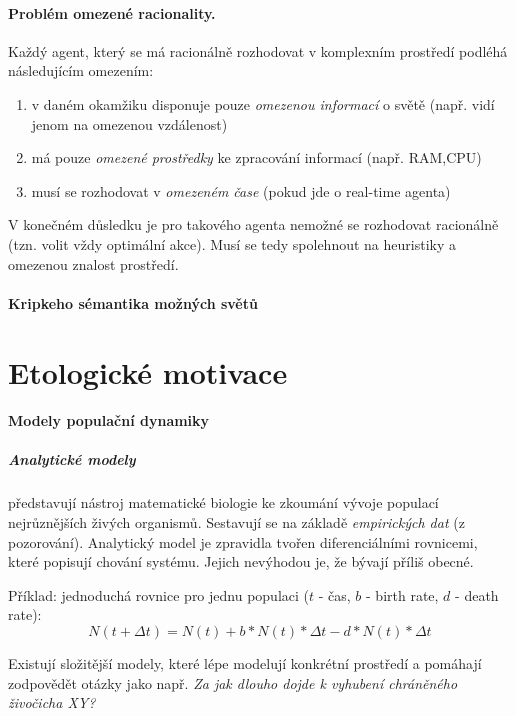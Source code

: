 \documentclass[a4paper]{article}      %
\begin{document}
\paragraph{Problém omezené racionality.} Každý agent, který se má racionálně rozhodovat v komplexním prostředí podléhá následujícím omezením:
\begin{enumerate}
\item v daném okamžiku disponuje pouze \emph{omezenou informací} o světě (např. vidí jenom na omezenou vzdálenost)
\item má pouze \emph{omezené prostředky} ke zpracování informací (např. RAM,CPU)
\item musí se rozhodovat v \emph{omezeném čase} (pokud jde o real-time agenta)
\end{enumerate}
V konečném důsledku je pro takového agenta nemožné se rozhodovat racionálně (tzn. volit vždy optimální akce).
Musí se tedy spolehnout na heuristiky a omezenou znalost prostředí.

\paragraph{Kripkeho sémantika možných světů}


\section{Etologické motivace}

\paragraph{Modely populační dynamiky}

\subparagraph{Analytické modely} představují nástroj matematické biologie ke zkoumání vývoje populací nejrůznějších živých organismů.
Sestavují se na základě \emph{empirických dat} (z pozorování). Analytický model je zpravidla tvořen diferenciálními rovnicemi, které popisují chování systému. Jejich nevýhodou je, že bývají příliš obecné.

Příklad: jednoduchá rovnice pro jednu populaci ($t$ - čas, $b$ - birth rate, $d$ - death rate):
\[
N(t+\Delta t) = N(t) + b*N(t)*\Delta t - d*N(t)*\Delta t
\]

Existují složitější modely, které lépe modelují konkrétní prostředí a pomáhají zodpovědět otázky jako např. \emph{Za jak dlouho dojde k vyhubení chráněného živočicha XY?}
\end{document}
